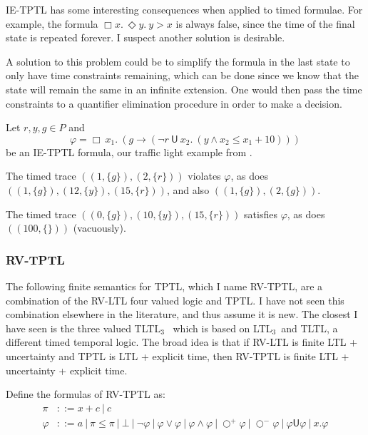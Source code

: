 \documentclass[a4paper]{article}
\newcommand{\U}{\mathsf{U}}
\newcommand{\sn}{\bigcirc^+}
\newcommand{\wn}{\bigcirc^-}
\newcommand{\ltlt}{LTL$_3$}
\begin{document}
\begin{remk}
IE-TPTL has some interesting consequences when applied to timed formulae. For example, the formula $\Box x.~ \Diamond y.~ y > x$ is always false, since the time of the final state is repeated forever. I suspect another solution is desirable.

A solution to this problem could be to simplify the formula in the last state to only have time constraints remaining, which can be done since we know that the state will remain the same in an infinite extension. One would then pass the time constraints to a quantifier elimination procedure in order to make a decision.
\end{remk}

\begin{eg}\label{ietptleg}
  Let $r,y,g\in P$ and \[\varphi = \Box ~x_1.~ (g \to (\neg r ~\U~ x_2.~ (y \land x_2 \leq x_1 + 10) ))\] be an IE-TPTL formula, our traffic light example from .

  The timed trace $((1,\{g\}),(2,\{r\}))$ violates $\varphi$, as does $((1,\{g\}),(12,\{y\}),(15,\{r\}))$, and also $((1,\{g\}),(2,\{g\}))$.

  The timed trace $((0,\{g\}),(10,\{y\}),(15,\{r\}))$ satisfies $\varphi$, as does $((100,\{\}))$ (vacuously).
\end{eg}

\subsubsection{RV-TPTL} The following finite semantics for TPTL, which I name RV-TPTL, are a combination of the RV-LTL four valued logic and TPTL. I have not seen this combination elsewhere in the literature, and thus assume it is new. The closest I have seen is the three valued TLTL$_3$~\autocite[6]{arafat2005runtime} which is based on \ltlt\ and TLTL, a different timed temporal logic. The broad idea is that if RV-LTL is finite LTL + uncertainty and TPTL is LTL + explicit time, then RV-TPTL is finite LTL + uncertainty + explicit time.

\begin{defn}

  Define the formulas of RV-TPTL as:
  \begin{align*}
    \pi &::= x + c ~|~ c\\
    \varphi &::= a ~|~ \pi \leq \pi ~|~ \bot ~|~ \neg \varphi ~|~\varphi \lor \varphi ~|~ \varphi \land \varphi ~|~ \sn \varphi ~|~ \wn \varphi ~|~ \varphi \U \varphi ~|~ x. \varphi
  \end{align*}
\end{defn}
\end{document}
